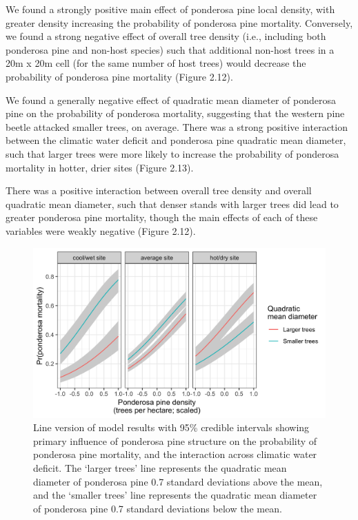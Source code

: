 \documentclass[twoside,12pt,final]{ucthesis-CA2012}
\begin{document}
\begin{ucmainmatter}
We found a strongly positive main effect of ponderosa pine local
density, with greater density increasing the probability of ponderosa
pine mortality. Conversely, we found a strong negative effect of overall
tree density (i.e., including both ponderosa pine and non-host species)
such that additional non-host trees in a 20m x 20m cell (for the same
number of host trees) would decrease the probability of ponderosa pine
mortality (Figure 2.12).

We found a generally negative effect of quadratic mean diameter of
ponderosa pine on the probability of ponderosa mortality, suggesting
that the western pine beetle attacked smaller trees, on average. There
was a strong positive interaction between the climatic water deficit and
ponderosa pine quadratic mean diameter, such that larger trees were more
likely to increase the probability of ponderosa mortality in hotter,
drier sites (Figure 2.13).

There was a positive interaction between overall tree density and
overall quadratic mean diameter, such that denser stands with larger
trees did lead to greater ponderosa pine mortality, though the main
effects of each of these variables were weakly negative (Figure 2.12).
\begin{figure}
\centering
\includegraphics[width=6.00000in]{figure/chap02/pipo_tpha_qmd_cwd_interaction.png}
\caption{Line version of model results with 95\% credible intervals
showing primary influence of ponderosa pine structure on the probability
of ponderosa pine mortality, and the interaction across climatic water
deficit. The `larger trees' line represents the quadratic mean diameter
of ponderosa pine 0.7 standard deviations above the mean, and the
`smaller trees' line represents the quadratic mean diameter of ponderosa
pine 0.7 standard deviations below the mean.}
\end{figure}

\end{ucmainmatter}
\end{document}

